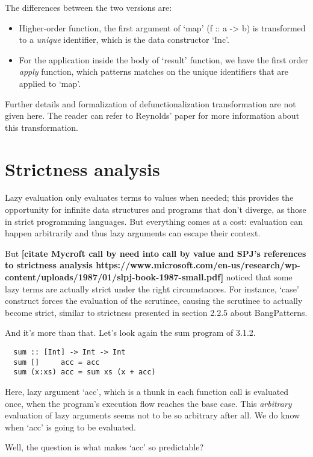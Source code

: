 \documentclass[diploma]{softlab-thesis}
\begin{document}
The differences between the two versions are:
\begin{itemize}
  \item Higher-order function, the first argument of `map' (f :: a -> b) is 
  transformed to a \textit{unique} identifier, which is the data constructor `Inc'.
  \item For the application inside the body of `result' function, we have the first order \textit{apply}
  function, which patterns matches on the unique identifiers that are applied to `map'.
\end{itemize}

Further details and formalization of defunctionalization transformation are not given here. 
The reader can refer to Reynolds' paper for more information about this transformation.

\section {Strictness analysis}

Lazy evaluation only evaluates terms to values when needed; this provides the 
opportunity for infinite data structures and programs that don't diverge, as those in 
strict programming languages. But everything comes at a cost: evaluation can happen 
arbitrarily and thus lazy arguments can escape their context.

But \cite{Mycroft:1980:TPT:647324.721526}
\textbf{[citate Mycroft call by need into call by value and SPJ's references to 
strictness analysis https://www.microsoft.com/en-us/research/wp-content/uploads/1987/01/slpj-book-1987-small.pdf]} 
noticed that some lazy terms are actually strict under the right circumstances. For instance, `case' 
construct forces the evaluation of the scrutinee, causing the scrutinee to actually become strict, 
similar to strictness presented in section 2.2.5 about BangPatterns. 

And it's more than that. Let's look again the sum program of 3.1.2.
\begin{verbatim}
  sum :: [Int] -> Int -> Int
  sum []     acc = acc
  sum (x:xs) acc = sum xs (x + acc)
\end{verbatim}

Here, lazy argument `acc', which is a thunk in each function call is evaluated once, when the program's 
execution flow reaches the base case. This \textit{arbitrary} evaluation of lazy arguments seems not to 
be so arbitrary after all. We do know when `acc' is going to be evaluated.
\newline
\par Well, the question is what makes `acc' so predictable? 
\end{document}
